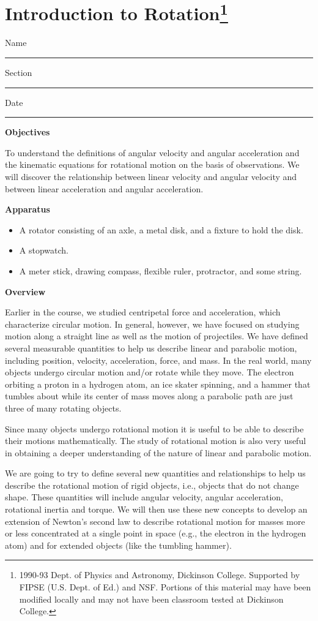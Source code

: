 
\section{Introduction to Rotation\footnote{
1990-93 Dept. of Physics and Astronomy, Dickinson College. Supported by FIPSE
(U.S. Dept. of Ed.) and NSF. Portions of this material may have been modified
locally and may not have been classroom tested at Dickinson College.
}}

Name \rule{2.0in}{0.1pt}\hfill{}Section \rule{1.0in}{0.1pt}\hfill{}Date \rule{1.0in}{0.1pt}

\textbf{Objectives} 

To understand the definitions of angular velocity and angular acceleration and
the kinematic equations for rotational motion on the basis of observations.
We will discover the relationship between linear velocity and angular velocity
and between linear acceleration and angular acceleration.

\textbf{Apparatus}

\begin{itemize}
\item A rotator consisting of an axle, a metal disk, and a fixture to hold the disk. 
\item A stopwatch. 
\item A meter stick, drawing compass, flexible ruler, protractor, and some string.
\end{itemize}
\textbf{Overview }

Earlier in the course, we studied centripetal force and acceleration, which
characterize circular motion. In general, however, we have focused on studying
motion along a straight line as well as the motion of projectiles. We have defined
several measurable quantities to help us describe linear and parabolic motion,
including position, velocity, acceleration, force, and mass. In the real world,
many objects undergo circular motion and/or rotate while they move. The electron
orbiting a proton in a hydrogen atom, an ice skater spinning, and a hammer that
tumbles about while its center of mass moves along a parabolic path are just
three of many rotating objects. 

Since many objects undergo rotational motion it is useful to be able to describe
their motions mathematically. The study of rotational motion is also very useful
in obtaining a deeper understanding of the nature of linear and parabolic motion.

We are going to try to define several new quantities and relationships to help
us describe the rotational motion of rigid objects, i.e., objects that do not
change shape. These quantities will include angular velocity, angular acceleration,
rotational inertia and torque. We will then use these new concepts to develop
an extension of Newton's second law to describe rotational motion for masses
more or less concentrated at a single point in space (e.g., the electron in
the hydrogen atom) and for extended objects (like the tumbling hammer).

